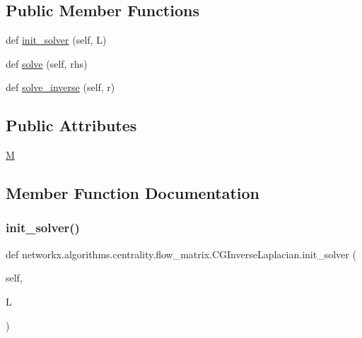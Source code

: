 \subsection*{Public Member Functions}
\begin{DoxyCompactItemize}
\item 
def \hyperlink{classnetworkx_1_1algorithms_1_1centrality_1_1flow__matrix_1_1CGInverseLaplacian_a688a79ca1dbee0a74e95e05ac5b6987c}{init\+\_\+solver} (self, L)
\item 
def \hyperlink{classnetworkx_1_1algorithms_1_1centrality_1_1flow__matrix_1_1CGInverseLaplacian_a0e8b9bda8ecafe3fa52b07d631f715fd}{solve} (self, rhs)
\item 
def \hyperlink{classnetworkx_1_1algorithms_1_1centrality_1_1flow__matrix_1_1CGInverseLaplacian_afe8995a9e58612ee4ab88274b519b0ac}{solve\+\_\+inverse} (self, r)
\end{DoxyCompactItemize}
\subsection*{Public Attributes}
\begin{DoxyCompactItemize}
\item 
\hyperlink{classnetworkx_1_1algorithms_1_1centrality_1_1flow__matrix_1_1CGInverseLaplacian_a4463e568b24e3d7bffd42507a8fed38e}{M}
\end{DoxyCompactItemize}


\subsection{Member Function Documentation}
\mbox{\label{classnetworkx_1_1algorithms_1_1centrality_1_1flow__matrix_1_1CGInverseLaplacian_a688a79ca1dbee0a74e95e05ac5b6987c}} 
\subsubsection{\texorpdfstring{init\+\_\+solver()}{init\_solver()}}
{\footnotesize\ttfamily def networkx.\+algorithms.\+centrality.\+flow\+\_\+matrix.\+C\+G\+Inverse\+Laplacian.\+init\+\_\+solver (\begin{DoxyParamCaption}\item[{}]{self,  }\item[{}]{L }\end{DoxyParamCaption})}

